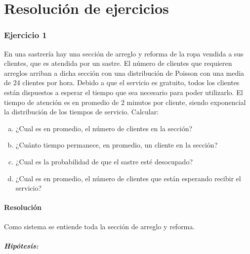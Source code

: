 \documentclass[a4paper,11pt]{article}
\begin{document}
\tableofcontents
\clearpage

\part{Resolución de ejercicios}
\section{\textbf{Ejercicio 1}}

\baselineskip=13pt
En una sastrería hay una sección de arreglo y reforma de la ropa vendida a sus
clientes, que es atendida por un sastre. El número de clientes que requieren
arreglos arriban a dicha sección con una distribución de Poisson con una media
de 24 clientes por hora. Debido a que el servicio es gratuito, todos los
clientes están dispuestos a esperar el tiempo que sea necesario para poder
utilizarlo. El tiempo de atención es en promedio de 2 minutos por cliente,
siendo exponencial la distribución de los tiempos de servicio. Calcular:

\leftskip=36pt
\parindent=-18pt
\begin{enumerate}[a)]
  \item ¿Cual es en promedio, el número de clientes en la sección?

  \item ¿Cuánto tiempo permanece, en promedio, un cliente en la sección?

  \item ¿Cual es la probabilidad de que el sastre esté desocupado?

  \item ¿Cual es en promedio, el número de clientes que están esperando recibir
    el servicio?
\end{enumerate}

\vspace{13pt}
\leftskip=0pt
\parindent=0pt
\subsection{\textbf{Resolución}}

Como sistema se entiende toda la sección de arreglo y
reforma.

\vspace{5pt}
\subsubsection*{Hipótesis:}
\end{document}
